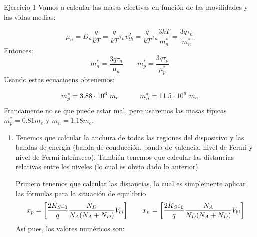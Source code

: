 \begin{texercise}
    Ejercicio 1
    \tcblower
    Vamos a calcular las masas efectivas en función de las movilidades y las vidas medias:

    \begin{equation}
        \mu_n = D_n \frac{q}{kT} = \frac{q}{kT} \tau_n v^2_{th} = \frac{q}{kT} \tau_n \frac{3kT}{m_n^*} = \frac{3q\tau_n}{m_n^*}
    \end{equation}
    Entonces:
    \begin{equation}
        m_n^* = \frac{3q\tau_n}{\mu_n} \qquad m_p^* = \frac{3q\tau_p}{\mu_p^*}
    \end{equation}
    Usando estas ecuacioens obtenemos:

    \begin{equation}
        m_p^* = 3.88 \cdot 10^6 \ m_e \quad \quad \quad m_n^* = 11.5 \cdot 10^6 \ m_e
    \end{equation}
    Francamente no se que puede estar mal, pero usaremos las masas típicas $m_p^* = 0.81m_e$ y $m_n=1.18 m_e$. 
    \begin{enumerate}[label=\alph*)]
        \item Tenemos que calcular la anchura de todas las regiones del dispositivo y las bandas de energía (banda de conducción, banda de valencia, nivel de Fermi y nivel de Fermi intrínseco). También tenemos que calcular las distancias relativas entre los niveles (lo cual es obvio dado lo anterior). 
        
        Primero tenemos que calcular las distancias, lo cual es simplemente aplicar las fórmulas para la situación de equilibrio
        \begin{equation}
            x_p = \left[ \frac{2K_S\varepsilon_0}{q} \frac{N_D}{N_A(N_A+N_D)}  V_{bi} \right]   \qquad 
            x_n = \left[ \frac{2K_S\varepsilon_0}{q} \frac{N_A}{N_D(N_A+N_D)}  V_{bi} \right]
        \end{equation}
        Así pues, los valores numéricos son: 


\end{enumerate}
\end{texercise}
